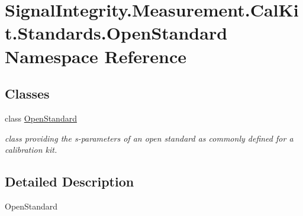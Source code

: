\hypertarget{namespaceSignalIntegrity_1_1Measurement_1_1CalKit_1_1Standards_1_1OpenStandard}{}\section{Signal\+Integrity.\+Measurement.\+Cal\+Kit.\+Standards.\+Open\+Standard Namespace Reference}
\label{namespaceSignalIntegrity_1_1Measurement_1_1CalKit_1_1Standards_1_1OpenStandard}
\subsection*{Classes}
\begin{DoxyCompactItemize}
\item 
class \hyperlink{classSignalIntegrity_1_1Measurement_1_1CalKit_1_1Standards_1_1OpenStandard_1_1OpenStandard}{Open\+Standard}
\begin{DoxyCompactList}\small\item\em class providing the s-\/parameters of an open standard as commonly defined for a calibration kit. \end{DoxyCompactList}\end{DoxyCompactItemize}


\subsection{Detailed Description}
\begin{DoxyVerb}OpenStandard\end{DoxyVerb}
 